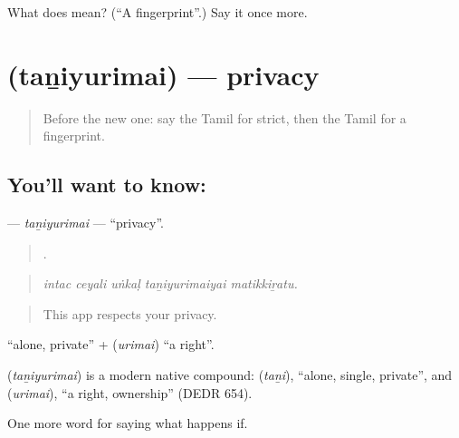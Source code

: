 \begin{tcolorbox}[breakable,colback=teal!4,colframe=teal!35!black,title={Before you move on}]
What does  mean? (\textquotedblleft{}A fingerprint\textquotedblright{}.) Say it once more.
\end{tcolorbox}
\section[\texorpdfstring{\ta{தனியுரிமை} (taṉiyurimai)}{தனியுரிமை (taṉiyurimai)}]{ (taṉiyurimai) — privacy}

\label{lesson:TA-C543-taniyurimai}



\begin{quote}
Before the new one: say the Tamil for strict, then the Tamil for a fingerprint.
\end{quote}

\subsection*{You'll want to know: }
\textbf{} — \emph{taṉiyurimai} — \textquotedblleft{}privacy\textquotedblright{}.

\begin{quote}
    .
\end{quote}

\begin{quote}
\emph{intac ceyali uṅkaḷ taṉiyurimaiyai matikkiṟatu.}
\end{quote}

\begin{quote}
This app respects your privacy.
\end{quote}

 \textquotedblleft{}alone, private\textquotedblright{} +  (\emph{urimai}) \textquotedblleft{}a right\textquotedblright{}.

\begin{cousinweb}
\textbf{} (\emph{taṉiyurimai}) is a modern native compound:  (\emph{taṉi}), \textquotedblleft{}alone, single, private\textquotedblright{}, and  (\emph{urimai}), \textquotedblleft{}a right, ownership\textquotedblright{} (DEDR 654).
\end{cousinweb}

\begin{grammarlens}[title={What you've built}]
One more word for saying what happens if.
\end{grammarlens}

